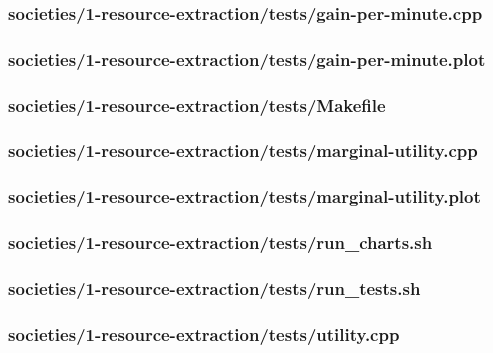 \documentclass{article}
\begin{document}
\subsubsection*{societies/1-resource-extraction/tests/gain-per-minute.cpp}


\subsubsection*{societies/1-resource-extraction/tests/gain-per-minute.plot}


\subsubsection*{societies/1-resource-extraction/tests/Makefile}


\subsubsection*{societies/1-resource-extraction/tests/marginal-utility.cpp}


\subsubsection*{societies/1-resource-extraction/tests/marginal-utility.plot}


\subsubsection*{societies/1-resource-extraction/tests/run\_charts.sh}


\subsubsection*{societies/1-resource-extraction/tests/run\_tests.sh}


\subsubsection*{societies/1-resource-extraction/tests/utility.cpp}

\end{document}
